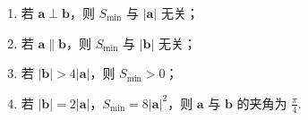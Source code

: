 \begin{description}
\begin{enumerate}[leftmargin=5pt]
\begin{enumerate}
\item 若 \(\bm{a} \perp \bm{b}\)，则 \(S_{\min}\) 与 \(|\bm{a}|\) 无关；

\item 若 \(\bm{a} \parallel \bm{b}\)，则 \(S_{\min}\) 与 \(|\bm{b}|\) 无关；

\item 若 \(|\bm{b}| > 4|\bm{a}|\)，则 \(S_{\min} > 0\)；

\item 若 \(|\bm{b}| = 2|\bm{a}|\)，\(S_{\min} = 8|\bm{a}|^2\)，则 \(\bm{a}\) 与 \(\bm{b}\) 的夹角为 \(\frac{\pi}{4}\).
\end{enumerate}

    \end{enumerate}

\end{description}

